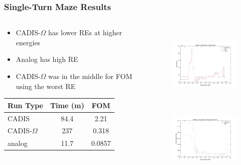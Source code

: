 \documentclass[xcolor=x11names,compress]{beamer}
\renewcommand{\(}{\begin{columns}}
\renewcommand{\)}{\end{columns}}
\newcommand{\<}[1]{\begin{column}{#1}}
\renewcommand{\>}{\end{column}}
\begin{document}
%
\begin{frame}[fragile]
  \frametitle{Single-Turn Maze Results}
  
\begin{columns}
  \begin{column}{0.45\textwidth}
  \begin{itemize}
    \item CADIS-$\Omega$ has lower REs at higher energies
    \item Analog has high RE
    \item CADIS-$\Omega$ was in the middle for FOM using the worst RE
  \end{itemize}
  \vspace*{1em}
  
  \begin{tabular}{|l|c c|}
  \hline
      Run Type & Time (m) & FOM \\  
      \hline
      CADIS  & 84.4  &  2.21 \\
      CADIS-$\Omega$ & 237 & \alert{0.318} \\
      analog & 11.7 & 0.0857\\
      \hline
  \end{tabular}
  \end{column}
  \begin{column}{0.55\textwidth}
  	\begin{figure}
  	\begin{center}
  		\includegraphics[height=1.5in,clip]{../figs/maze_2_tally_result_compare.pdf}\\
  		\includegraphics[height=1.5in,clip]{../figs/maze_2_tally_error_compare.pdf}
	\end{center}
  	\end{figure}
  \end{column}
\end{columns}
\end{frame}
\end{document}
